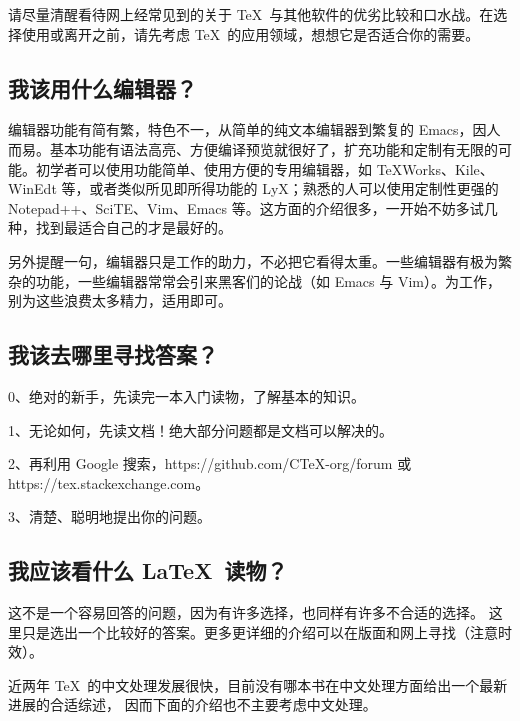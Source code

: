 请尽量清醒看待网上经常见到的关于 \TeX\ 与其他软件的优劣比较和口水战。在选择使用或离开之前，请先考虑
\TeX\ 的应用领域，想想它是否适合你的需要。

\def\AAAA{}

\subsection{我该用什么编辑器？}

编辑器功能有简有繁，特色不一，从简单的纯文本编辑器到繁复的 Emacs，因人而易。基本功能有语法高亮、方便编译预览就很好了，扩充功能和定制有无限的可能。初学者可以使用功能简单、使用方便的专用编辑器，如 TeXWorks、Kile、WinEdt 等，或者类似所见即所得功能的 LyX；熟悉的人可以使用定制性更强的 Notepad++、SciTE、Vim、Emacs 等。这方面的介绍很多，一开始不妨多试几种，找到最适合自己的才是最好的。

另外提醒一句，编辑器只是工作的助力，不必把它看得太重。一些编辑器有极为繁杂的功能，一些编辑器常常会引来黑客们的论战（如 Emacs 与 Vim）。为工作，别为这些浪费太多精力，适用即可。

\subsection{我该去哪里寻找答案？}

0、绝对的新手，先读完一本入门读物，了解基本的知识。

1、无论如何，先读文档！绝大部分问题都是文档可以解决的。

2、再利用 Google 搜索，https://github.com/CTeX-org/forum 或 https://tex.stackexchange.com。

3、清楚、聪明地提出你的问题。


\subsection{我应该看什么 \LaTeX\ 读物？}

这不是一个容易回答的问题，因为有许多选择，也同样有许多不合适的选择。
这里只是选出一个比较好的答案。更多更详细的介绍可以在版面和网上寻找（注意时效）。

近两年 \TeX\ 的中文处理发展很快，目前没有哪本书在中文处理方面给出一个最新进展的合适综述，
因而下面的介绍也不主要考虑中文处理。

